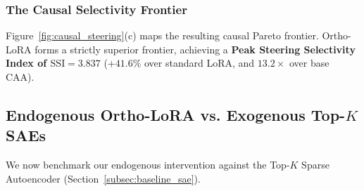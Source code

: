 \documentclass[10pt,twocolumn,letterpaper]{article}
\begin{document}
\subsubsection{The Causal Selectivity Frontier}
Figure~\ref{fig:causal_steering}(c) maps the resulting causal Pareto frontier. Ortho-LoRA forms a strictly superior frontier, achieving a \textbf{Peak Steering Selectivity Index of $\text{SSI} = 3.837$} ($+41.6\%$ over standard LoRA, and $13.2\times$ over base CAA).

\subsection{Endogenous Ortho-LoRA vs. Exogenous Top-\texorpdfstring{$K$}{K} SAEs}
\label{subsec:res_sae_comparison}

We now benchmark our endogenous intervention against the Top-$K$ Sparse Autoencoder (Section~\ref{subsec:baseline_sae}).

\begin{table}[t!]
    \centering
    \small
    \caption{\textbf{Head-to-Head Comparative Benchmark: Endogenous Ortho-LoRA vs. Exogenous Top-$K$ SAE.} Evaluated on \texttt{Qwen-2.5-0.5B} ($d_{\text{model}} = 896$, Layer 12) on the test split of \texttt{tweet\_eval}. Ortho-LoRA achieves a $112.1\times$ parameter reduction and $0\text{ ms}$ inference latency when merged, while preventing the severe task degradation suffered by exogenous reconstruction bottlenecks.}
    \label{tab:res_sae_vs_ortho}
\end{table}
\end{document}
